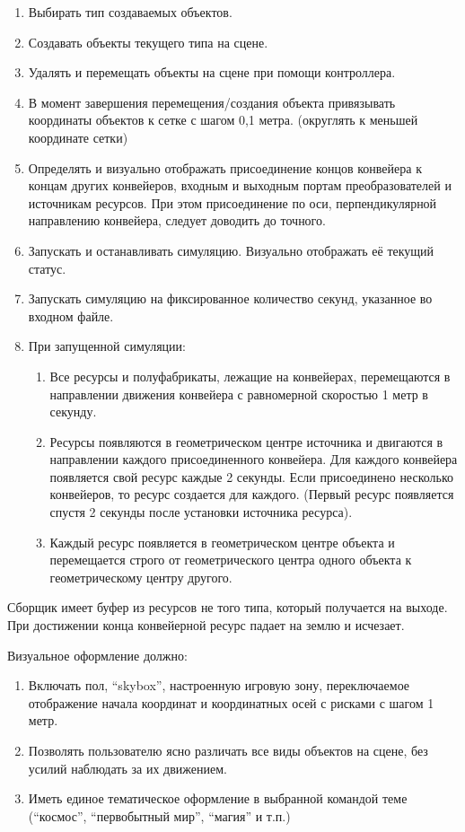 \begin{enumerate}
    \item Выбирать тип создаваемых объектов.
    \item Создавать объекты текущего типа на сцене.
    \item Удалять и перемещать объекты на сцене при помощи контроллера.
    \item В момент завершения перемещения/создания объекта привязывать координаты объектов к сетке с шагом 0,1 метра. (округлять к меньшей координате сетки)
    \item Определять и визуально отображать присоединение концов конвейера к концам других конвейеров, входным и выходным портам преобразователей и источникам ресурсов. При этом присоединение по оси, перпендикулярной направлению конвейера, следует доводить до точного.
    \item Запускать и останавливать симуляцию. Визуально отображать её текущий статус.
    \item Запускать симуляцию на фиксированное количество секунд, указанное во входном файле.
    \item При запущенной симуляции:
    \begin{enumerate}
        \item Все ресурсы и полуфабрикаты, лежащие на конвейерах, перемещаются в направлении движения конвейера с равномерной скоростью 1 метр в секунду.
        \item Ресурсы появляются в геометрическом центре источника и двигаются в направлении каждого присоединенного конвейера. Для каждого конвейера появляется свой ресурс каждые 2 секунды. Если присоединено несколько конвейеров, то ресурс создается для каждого. (Первый ресурс появляется спустя 2 секунды после установки источника ресурса).
        \item Каждый ресурс появляется в геометрическом центре объекта и перемещается строго от геометрического центра одного объекта к геометрическому центру другого.                        
    \end{enumerate}
\end{enumerate}


Сборщик имеет буфер из ресурсов не того типа, который получается на выходе.
При достижении конца конвейерной ресурс падает на землю и исчезает.

Визуальное оформление должно:
\begin{enumerate}
    \item Включать пол, “skybox”, настроенную игровую зону, переключаемое отображение начала координат и координатных осей с рисками с шагом 1 метр.
    \item Позволять пользователю ясно различать все виды объектов на сцене, без усилий наблюдать за их движением.
    \item Иметь единое тематическое оформление в выбранной командой теме (“космос”, “первобытный мир”, “магия” и т.п.)        
\end{enumerate}

